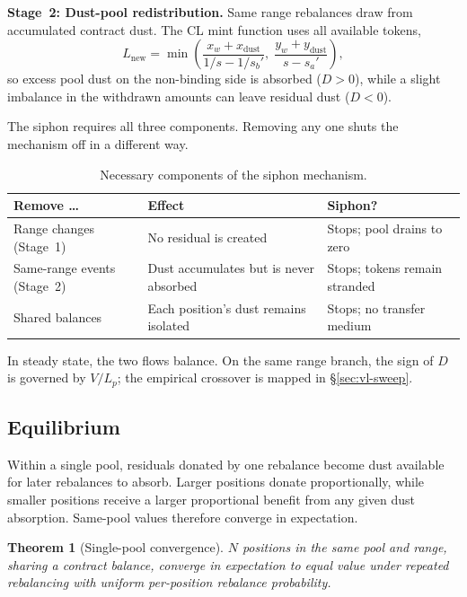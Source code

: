 \documentclass[11pt,a4paper]{article}
\renewcommand{\arraystretch}{1.05}
\theoremstyle{plain}
\newtheorem{theorem}{Theorem}
\begin{document}
\textbf{Stage~2: Dust-pool redistribution.} Same range rebalances draw from accumulated contract dust. The CL mint function uses all available tokens,
\begin{equation}\label{eq:mint}
L_{\text{new}} = \min\!\left(\frac{x_w + x_{\text{dust}}}{1/s - 1/s_b'}, \; \frac{y_w + y_{\text{dust}}}{s - s_a'}\right),
\end{equation}
so excess pool dust on the non-binding side is absorbed ($D > 0$), while a slight imbalance in the withdrawn amounts can leave residual dust ($D < 0$).

The siphon requires all three components. Removing any one shuts the mechanism off in a different way.

\begin{table}[H]
\centering
\caption{Necessary components of the siphon mechanism.}
\label{tab:siphon-components}
\renewcommand{\arraystretch}{1.05}
\begin{tabular}{@{}lll@{}}
\toprule
Remove \dots & Effect & Siphon? \\
\midrule
Range changes (Stage~1)     & No residual is created                  & Stops; pool drains to zero \\
Same-range events (Stage~2) & Dust accumulates but is never absorbed & Stops; tokens remain stranded \\
Shared balances             & Each position's dust remains isolated  & Stops; no transfer medium \\
\bottomrule
\end{tabular}
\end{table}

In steady state, the two flows balance. On the same range branch, the sign of $D$ is governed by $V/L_p$; the empirical crossover is mapped in \S\ref{sec:vl-sweep}.

\subsection{Equilibrium}\label{sec:equilibrium}

Within a single pool, residuals donated by one rebalance become dust available for later rebalances to absorb. Larger positions donate proportionally, while smaller positions receive a larger proportional benefit from any given dust absorption. Same-pool values therefore converge in expectation.

\begin{theorem}[Single-pool convergence]\label{thm:convergence}
$N$ positions in the same pool and range, sharing a contract balance, converge in expectation to equal value under repeated rebalancing with uniform per-position rebalance probability.
\end{theorem}
\end{document}
